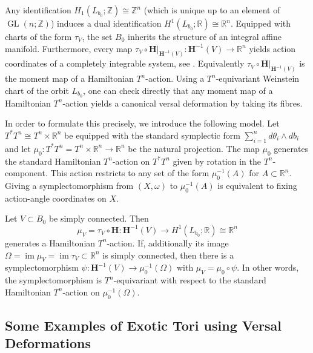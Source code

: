 \documentclass[12pt,a4paper,draft]{scrartcl}
\DeclareMathOperator{\im}{im}
\DeclareMathOperator{\GL}{GL}
\begin{document}
Any identification $H_1(L_{b_0};\mathbb{Z}) \cong \mathbb{Z}^n$ (which is unique up to an element of $\GL(n;ℤ)$) induces a dual identification $H^1(L_{b_0};\mathbb{R}) \cong \mathbb{R}^n$.
Equipped with charts of the form $τ_V$, the set $B_0$ inherits the structure of an integral affine manifold.
Furthermore, every map $τ_V \circ \mathbf{H}\vert_{\mathbf{H}^{-1}(V)} \colon \mathbf{H}^{-1}(V) \rightarrow \mathbb{R}^n$ yields action coordinates of a completely integrable system, see \cite[Lemma 2.15]{evans2021atfs}.
Equivalently $τ_V \circ \mathbf{H}\vert_{\mathbf{H}^{-1}(V)}$ is the moment map of a Hamiltonian $T^n$-action. Using a $T^n$-equivariant Weinstein chart of the orbit $L_{b_0}$, one can check directly that any moment map of a Hamiltonian $T^n$-action yields a canonical versal deformation by taking its fibres.

In order to formulate this precisely, we introduce the following model. Let $T^*T^n \cong T^n \times \mathbb{R}^n$ be equipped with the standard symplectic form $\sum_{i=1}^n d\theta_i \wedge db_i$ and let $\mu_0 \colon T^*T^n = T^n \times \mathbb{R}^n \rightarrow \mathbb{R}^n$ be the natural projection. The map $\mu_0$ generates the standard Hamiltonian $T^n$-action on $T^*T^n$ given by rotation in the $T^n$-component. This action restricts to any set of the form $\mu_0^{-1}(A)$ for $A \subset \mathbb{R}^n$. Giving a symplectomorphism from $(X,\omega)$ to $\mu_0^{-1}(A)$ is equivalent to fixing action-angle coordinates on $X$. 

\begin{proposition}
    \label{thm:flux_moment_map}
    Let $V \subset B_0$ be simply connected. Then 
    \[
        \mu_V = τ_V \circ \mathbf{H} \colon \mathbf{H}^{-1}(V) \rightarrow H^1(L_{b_0};\mathbb{R}) \cong \mathbb{R}^n
    \]
    generates a Hamiltonian $T^n$-action. If, additionally its image $\Omega = \im \mu_V = \im τ_V \subset \mathbb{R}^n$ is simply connected, then there is a symplectomorphism $\psi \colon \mathbf{H}^{-1}(V) \rightarrow \mu_0^{-1}(\Omega)$ with $\mu_V = \mu_0 \circ \psi$. In other words, the symplectomorphism is $T^n$-equivariant with respect to the standard Hamiltonian $T^n$-action on $\mu_0^{-1}(\Omega)$.
\end{proposition}

\subsection{Some Examples of Exotic Tori using Versal Deformations}
\end{document}
